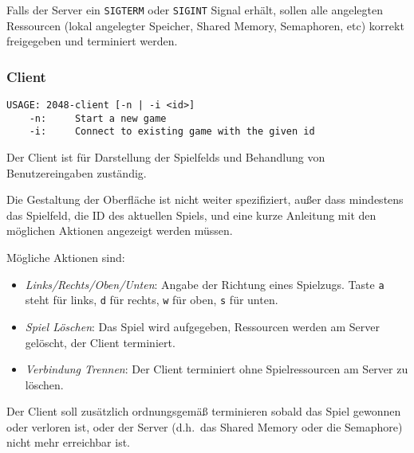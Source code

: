 Falls der Server ein \verb|SIGTERM| oder \verb|SIGINT| Signal erhält, sollen
alle angelegten Ressourcen (lokal angelegter Speicher, Shared Memory,
Semaphoren, etc) korrekt freigegeben und terminiert werden.

\subsubsection*{Client}

\begin{verbatim}
USAGE: 2048-client [-n | -i <id>]
    -n:     Start a new game
    -i:     Connect to existing game with the given id
\end{verbatim}

Der Client ist für Darstellung der Spielfelds und Behandlung von
Benutzereingaben zuständig.

Die Gestaltung der Oberfläche ist nicht weiter spezifiziert, außer dass
mindestens das Spielfeld, die ID des aktuellen Spiels, und eine kurze Anleitung
mit den möglichen Aktionen angezeigt werden müssen.

Mögliche Aktionen sind:

\begin{itemize}
\item \emph{Links/Rechts/Oben/Unten}: Angabe der Richtung eines Spielzugs.
      Taste \verb|a| steht für links, \verb|d| für rechts, \verb|w| für oben,
      \verb|s| für unten.
\item \emph{Spiel Löschen}: Das Spiel wird aufgegeben, Ressourcen werden am
      Server gelöscht, der Client terminiert.
\item \emph{Verbindung Trennen}: Der Client terminiert ohne Spielressourcen am
      Server zu löschen.
\end{itemize}

Der Client soll zusätzlich ordnungsgemäß terminieren sobald das Spiel gewonnen
oder verloren ist, oder der Server (d.h.\ das Shared Memory oder die Semaphore)
nicht mehr erreichbar ist.

\osueguidelinesthree


